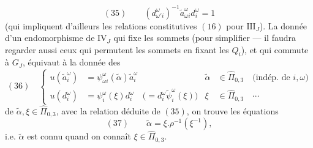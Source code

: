 \[
(35)\qquad(d_{\omega'i}^\omega)^{-1}\widetilde a_{\omega i}^{\omega}d_i^\omega=1
\]
(qui impliquent d'ailleurs les relations constitutives $(16)$ pour $\mathrm{III}_J$). La donnée d'un endomorphisme de $\mathrm{IV}_J$ qui fixe les  sommets (pour simplifier --- il faudra regarder aussi ceux qui permutent les sommets  en fixant les $Q_i$),  et qui commute à $G_J$, équivaut à la donnée des
\[
(36)\quad\left\{\begin{aligned}
u(\widetilde a_i^\omega)&=\psi_{\omega i}^\omega(\widetilde\alpha)\widetilde a_i^\omega
&\widetilde\alpha&\in\widehat\Pi_{0,3}\quad\text{(indép. de }i,\omega\text{)}\\
u(d_i^\omega)&=\psi_i^\omega(\xi)d_i^\omega\quad\bigl(=d_i^\omega\widetilde\psi_i^\omega(\xi)\bigr)
&\xi&\in\widehat\Pi_{0,3}\quad\cdots
\end{aligned}\right.
\]
de $\widetilde\alpha,\xi\in\widehat\Pi_{0,3}$, avec la relation déduite de $(35)$, on trouve les équations
\[
(37)\qquad\widetilde\alpha=\xi.\rho^{-1}(\xi^{-1}),
\]
i.e. $\widetilde\alpha$ est connu quand on connaît $\xi\in\widehat\Pi_{0,3}$.

